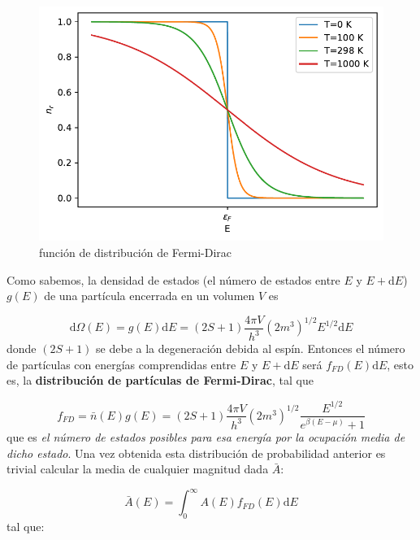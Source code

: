 \documentclass[12pt,a4paper]{article}
\numberwithin{equation}{section}
\numberwithin{figure}{section}
\newcommand{\D}{\mathrm{d}}
\theoremstyle{definition}
\begin{document}
\begin{figure}[h!]\centering
    \includegraphics[scale=1]{03-Fermi-Dirac.pdf}
    \caption[short]{función de distribución de Fermi-Dirac}
    \label{Fig:3.2.01}
\end{figure}

Como sabemos, la densidad de estados (el número de estados entre $E$ y $E+\D E$) $g(E)$ de una partícula encerrada en un volumen $V$ es

\begin{equation}
\D \Omega (E) = g(E) \D E = (2S+1) \frac{4 \pi V}{h^3} (2m^3)^{1/2} E^{1/2} \D E
\end{equation}
donde $(2S+1)$ se debe a la degeneración debida al espín. Entonces el número de partículas con energías comprendidas entre $E$ y $E+\D E$ será $f_{FD}(E) \D E$, esto es, la \textbf{distribución de partículas de Fermi-Dirac}, tal que

\begin{equation}
f_{FD} = \bar{n} (E) g(E) = (2S+1) \frac{4 \pi V}{h^3} (2m^3)^{1/2} \frac{E^{1/2}}{e^{\beta(E-\mu)}+1}
\end{equation}
que es \textit{el número de estados posibles para esa energía por la ocupación media de dicho estado}. Una vez obtenida esta distribución de probabilidad anterior es trivial calcular la media de cualquier magnitud dada $\bar{A}$:

\begin{equation}
\bar{A} (E) = \int_0^\infty A(E) f_{FD} (E) \D E
\end{equation}
tal que:
\end{document}
